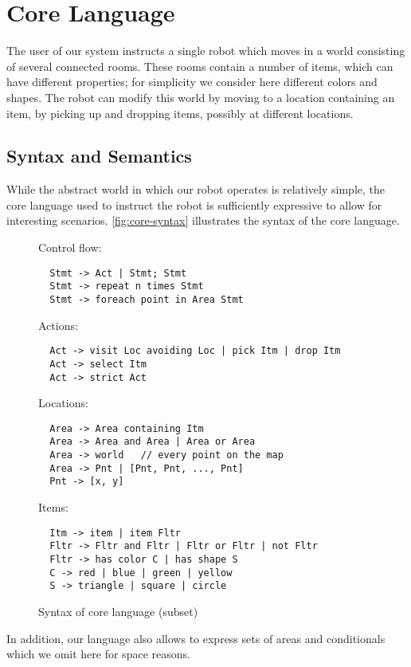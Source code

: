 \section{Core Language}


The user of our system instructs a single robot which moves in a world
consisting of several connected rooms. These rooms contain a number of items,
which can have different properties; for simplicity we consider here different
colors and shapes. The robot can modify this world by moving to a location
containing an item, by picking up and dropping items, possibly at different
locations.

\subsection{Syntax and Semantics}


While the abstract world in which our robot operates is relatively simple,
the core language used to instruct the robot is sufficiently expressive to
allow for interesting scenarios. \autoref{fig:core-syntax} illustrates the
syntax of the core language.
\begin{figure}[t]
  Control flow:
  \begin{lstlisting}
  Stmt -> Act | Stmt; Stmt
  Stmt -> repeat n times Stmt
  Stmt -> foreach point in Area Stmt
  \end{lstlisting}

  Actions:
  \begin{lstlisting}
  Act -> visit Loc avoiding Loc | pick Itm | drop Itm
  Act -> select Itm
  Act -> strict Act
  \end{lstlisting}

  Locations:
  \begin{lstlisting}
  Area -> Area containing Itm
  Area -> Area and Area | Area or Area
  Area -> world   // every point on the map
  Area -> Pnt | [Pnt, Pnt, ..., Pnt]
  Pnt -> [x, y]
  \end{lstlisting}

  Items:
  \begin{lstlisting}
  Itm -> item | item Fltr
  Fltr -> Fltr and Fltr | Fltr or Fltr | not Fltr
  Fltr -> has color C | has shape S
  C -> red | blue | green | yellow
  S -> triangle | square | circle
  \end{lstlisting}
  \caption{Syntax of core language (subset)}
  \label{fig:core-syntax}
\end{figure}
In addition, our language also allows to express sets of areas and
conditionals which we omit here for space reasons.

